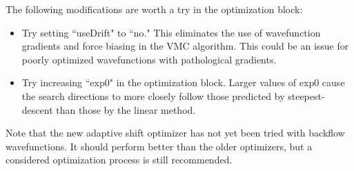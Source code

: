 The following modifications are worth a try in the optimization block:

\begin{itemize}
\item Try setting ``useDrift" to ``no."  This eliminates the use of wavefunction gradients and force biasing in the VMC algorithm.  This could be an issue for poorly optimized wavefunctions with pathological gradients.  
\item Try increasing ``exp0" in the optimization block.  Larger values of exp0 cause the search directions to more closely follow those predicted by steepest-descent than those by the linear method.
\end{itemize}

Note that the new adaptive shift optimizer has not yet been tried with backflow wavefunctions. It should perform better than the older optimizers, but a considered optimization process is still recommended.


